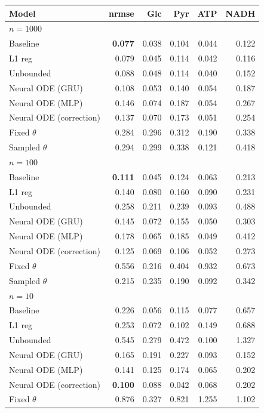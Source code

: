 \begin{tabular}{lrrrrr}
\toprule
Model & nrmse & Glc & Pyr & ATP & NADH \\
\midrule
\multicolumn{6}{l}{\textbf{$n=1000$}} \\
Baseline & \textbf{0.077} & 0.038 & 0.104 & 0.044 & 0.122 \\
L1 reg & 0.079 & 0.045 & 0.114 & 0.042 & 0.116 \\
Unbounded & 0.088 & 0.048 & 0.114 & 0.040 & 0.152 \\
Neural ODE (GRU) & 0.108 & 0.053 & 0.140 & 0.054 & 0.187 \\
Neural ODE (MLP) & 0.146 & 0.074 & 0.187 & 0.054 & 0.267 \\
Neural ODE (correction) & 0.137 & 0.070 & 0.173 & 0.051 & 0.254 \\
Fixed $\theta$ & 0.284 & 0.296 & 0.312 & 0.190 & 0.338 \\
Sampled $\theta$ & 0.294 & 0.299 & 0.338 & 0.121 & 0.418 \\
\midrule
\multicolumn{6}{l}{\textbf{$n=100$}} \\
Baseline & \textbf{0.111} & 0.045 & 0.124 & 0.063 & 0.213 \\
L1 reg & 0.140 & 0.080 & 0.160 & 0.090 & 0.231 \\
Unbounded & 0.258 & 0.211 & 0.239 & 0.093 & 0.488 \\
Neural ODE (GRU) & 0.145 & 0.072 & 0.155 & 0.050 & 0.303 \\
Neural ODE (MLP) & 0.178 & 0.065 & 0.185 & 0.049 & 0.412 \\
Neural ODE (correction) & 0.125 & 0.069 & 0.106 & 0.052 & 0.273 \\
Fixed $\theta$ & 0.556 & 0.216 & 0.404 & 0.932 & 0.673 \\
Sampled $\theta$ & 0.215 & 0.235 & 0.190 & 0.092 & 0.342 \\
\midrule
\multicolumn{6}{l}{\textbf{$n=10$}} \\
Baseline & 0.226 & 0.056 & 0.115 & 0.077 & 0.657 \\
L1 reg & 0.253 & 0.072 & 0.102 & 0.149 & 0.688 \\
Unbounded & 0.545 & 0.279 & 0.472 & 0.100 & 1.327 \\
Neural ODE (GRU) & 0.165 & 0.191 & 0.227 & 0.093 & 0.152 \\
Neural ODE (MLP) & 0.141 & 0.125 & 0.174 & 0.065 & 0.202 \\
Neural ODE (correction) & \textbf{0.100} & 0.088 & 0.042 & 0.068 & 0.202 \\
Fixed $\theta$ & 0.876 & 0.327 & 0.821 & 1.255 & 1.102 \\

\end{tabular}
